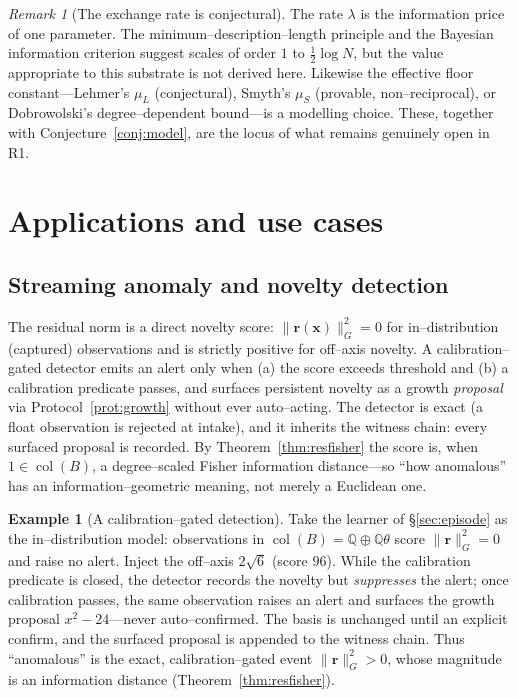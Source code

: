 \documentclass[11pt]{article}
\theoremstyle{plain}
\theoremstyle{definition}
\newtheorem{example}[theorem]{Example}
\theoremstyle{remark}
\newtheorem{remark}[theorem]{Remark}
\newcommand{\Q}{\mathbb{Q}}
\newcommand{\rr}{\mathbf{r}}
\newcommand{\xx}{\mathbf{x}}
\newcommand{\GG}{G}
\newcommand{\BB}{B}
\DeclareMathOperator{\col}{col}
\begin{document}
\begin{remark}[The exchange rate is conjectural]\label{rem:exchange}
The rate $\lambda$ is the information price of one parameter. The minimum--description--length principle
\cite{Rissanen} and the Bayesian information criterion \cite{Schwarz} suggest scales of order $1$ to
$\tfrac12\log N$, but the value appropriate to this substrate is not derived here. Likewise the effective
floor constant---Lehmer's $\mu_L$ (conjectural), Smyth's $\mu_S$ (provable, non--reciprocal), or
Dobrowolski's degree--dependent bound---is a modelling choice. These, together with
Conjecture~\ref{conj:model}, are the locus of what remains genuinely open in R1.
\end{remark}

\section{Applications and use cases}\label{sec:apps}

\subsection{Streaming anomaly and novelty detection}
The residual norm is a direct novelty score: $\lVert\rr(\xx)\rVert_{\GG}^2=0$ for in--distribution
(captured) observations and is strictly positive for off--axis novelty. A calibration--gated detector emits
an alert only when (a) the score exceeds threshold and (b) a calibration predicate passes, and surfaces
persistent novelty as a growth \emph{proposal} via Protocol~\ref{prot:growth} without ever auto--acting. The
detector is exact (a float observation is rejected at intake), and it inherits the witness chain: every
surfaced proposal is recorded. By Theorem~\ref{thm:resfisher} the score is, when $1\in\col(\BB)$, a
degree--scaled Fisher information distance---so ``how anomalous'' has an information--geometric meaning, not
merely a Euclidean one.

\begin{example}[A calibration--gated detection]\label{ex:anomaly}
Take the learner of \S\ref{sec:episode} as the in--distribution model: observations in
$\col(\BB)=\Q\oplus\Q\theta$ score $\lVert\rr\rVert_{\GG}^2=0$ and raise no alert. Inject the off--axis
$2\sqrt6$ (score $96$). While the calibration predicate is closed, the detector records the novelty but
\emph{suppresses} the alert; once calibration passes, the same observation raises an alert and surfaces the
growth proposal $x^2-24$---never auto--confirmed. The basis is unchanged until an explicit confirm, and the
surfaced proposal is appended to the witness chain. Thus ``anomalous'' is the exact, calibration--gated event
$\lVert\rr\rVert_{\GG}^2>0$, whose magnitude is an information distance (Theorem~\ref{thm:resfisher}).
\end{example}
\end{document}
